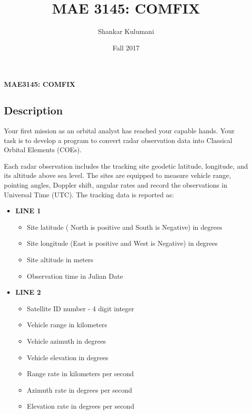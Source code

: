 \documentclass[11pt, reqno]{article}    %
\title{MAE 3145: COMFIX}
\author{Shankar Kulumani}
\date{Fall 2017}                          %
\begin{document}
\begin{center}
{\Large \textbf{MAE3145: COMFIX}}
\end{center}
\subsection*{Description}
Your first mission as an orbital analyst has reached your capable hands.
Your task is to develop a program to convert radar observation data into Classical Orbital Elements (COEs).

Each radar observation includes the tracking site geodetic latitude, longitude, and its altitude above sea level.
The sites are equipped to measure vehicle range, pointing angles, Doppler shift, angular rates and record the observations in Universal Time (UTC).
The tracking data is reported as:
\begin{itemize}
    \item \textbf{LINE 1}
        \begin{itemize}
            \item Site latitude ( North is positive and South is Negative) in degrees
            \item Site longitude (East is positive and West is Negative) in degrees
            \item Site altitude in meters
            \item Observation time in Julian Date 
        \end{itemize}
    \item \textbf{LINE 2}
        \begin{itemize}
            \item Satellite ID number - 4 digit integer
            \item Vehicle range in kilometers
            \item Vehicle azimuth in degrees
            \item Vehicle elevation in degrees
            \item Range rate in kilometers per second
            \item Azimuth rate in degrees per second
            \item Elevation rate in degrees per second
        \end{itemize}
\end{itemize}
\end{document}
